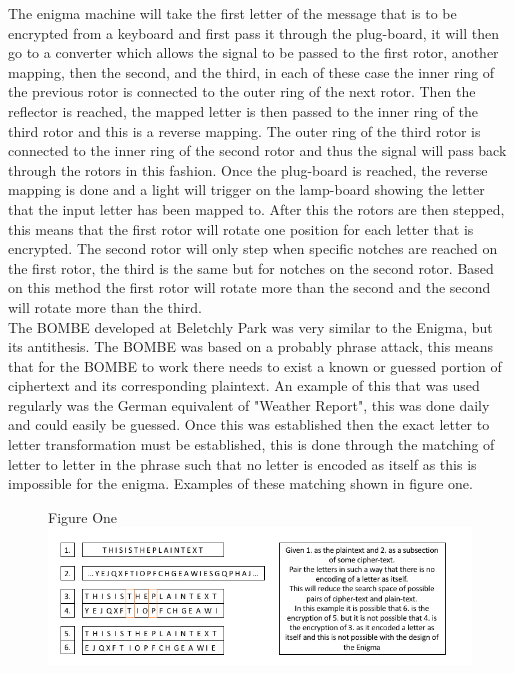 \documentclass[12pt,a4paper]{article}
\begin{document}
The enigma machine will take the first letter of the message that is to be encrypted from a keyboard and first pass it through the plug-board, it will then go to a converter which allows the signal to be passed to the first rotor, another mapping, then the second, and the third, in each of these case the inner ring of the previous rotor is connected to the outer ring of the next rotor. Then the reflector is reached, the mapped letter is then passed to the inner ring of the third rotor and this is a reverse mapping. The outer ring of the third rotor is connected to the inner ring of the second rotor and thus the signal will pass back through the rotors in this fashion. Once the plug-board is reached, the reverse mapping is done and a light will trigger on the lamp-board showing the letter that the input letter has been mapped to. After this the rotors are then stepped, this means that the first rotor will rotate one position for each letter that is encrypted. The second rotor will only step when specific notches are reached on the first rotor, the third is the same but for notches on the second rotor. Based on this method the first rotor will rotate more than the second and the second will rotate more than the third.\\

The BOMBE developed at Beletchly Park was very similar to the Enigma, but its antithesis. The BOMBE was based on a probably phrase attack, this means that for the BOMBE to work there needs to exist a known or guessed portion of ciphertext and its corresponding plaintext. An example of this that was used regularly was the German equivalent of "Weather Report", this was done daily and could easily be guessed. Once this was established then the exact letter to letter transformation must be established, this is done through the matching of letter to letter in the phrase such that no letter is encoded as itself as this is impossible for the enigma. Examples of these matching shown in figure one.

\begin{figure}[h]
\centering
Figure One
\includegraphics[width=\textwidth]{StageOneBOMBE.png}
\end{figure}
\end{document}
